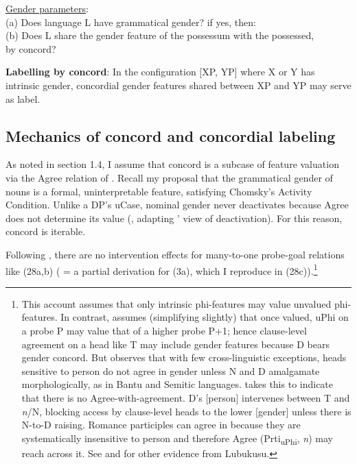 \documentclass[output=paper
,modfonts
,nonflat]{langsci/langscibook}
\begin{document}
{\begin{exe}
\ex 
\underline{Gender parameters}:\\
(a)   Does language L have grammatical gender? if yes, then:\\                      
(b)   Does L share the gender feature of the possessum with the possessed,\\ \hspace{1cm}by concord?
\end{exe}
\begin{exe}
\ex 
\textbf{Labelling by concord}: In the configuration [XP, YP] where X or Y has intrinsic gender, concordial gender features shared between XP and YP may serve as label.
\end{exe}

\subsection{Mechanics of concord and concordial labeling}
As noted in section 1.4, I assume that concord is a subcase of feature valuation via the Agree relation of \citealt{Chomsky2000, Chomsky2001}. Recall my proposal that the grammatical gender of nouns is a formal, uninterpretable feature, satisfying Chomsky's Activity Condition. Unlike a DP's uCase, nominal gender never deactivates because Agree does not determine its value (\citealt{Carstens2010, Carstens2011}, adapting \citealt{Nevins2005}' view of deactivation). For this reason, concord is iterable. 

Following \citet{Hiraiwa2001}, there are no intervention effects for many-to-one probe-goal relations like (28a,b) ( = a partial derivation for (3a), which I reproduce in (28c)).\footnote{This account assumes that only intrinsic phi-features may value unvalued phi-features. In contrast, \citet{Danon2011} assumes (simplifying slightly) that once valued, uPhi on a probe P may value that of a higher probe P+1; hence clause-level agreement on a head like T may include gender features because D bears gender concord. But \citet{Carstens2011} observes that with few cross-linguistic exceptions, heads sensitive to person do not agree in gender unless N and D amalgamate morphologically, as in Bantu and Semitic languages. \citet{Carstens2011} takes this to indicate that there is no Agree-with-agreement. D’s [person] intervenes between T and \textit{n}/N, blocking access by clause-level heads to the lower [gender] unless there is N-to-D raising. Romance participles can agree in because they are systematically insensitive to person and therefore Agree (Prti\textsubscript{uPhi}, \textit{n}) may reach across it. See \citealt{Carstens_Diercks2013b} and \citealt{Wasike2007} for other evidence from Lubukusu.} 

}
\end{document}
